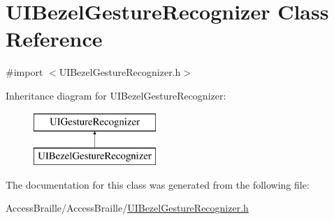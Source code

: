 \hypertarget{interface_u_i_bezel_gesture_recognizer}{\section{U\-I\-Bezel\-Gesture\-Recognizer Class Reference}
\label{interface_u_i_bezel_gesture_recognizer}
}


{\ttfamily \#import $<$U\-I\-Bezel\-Gesture\-Recognizer.\-h$>$}

Inheritance diagram for U\-I\-Bezel\-Gesture\-Recognizer\-:\begin{figure}[H]
\begin{center}
\leavevmode
\includegraphics[height=2.000000cm]{interface_u_i_bezel_gesture_recognizer}
\end{center}
\end{figure}


The documentation for this class was generated from the following file\-:\begin{DoxyCompactItemize}
\item 
Access\-Braille/\-Access\-Braille/\hyperlink{_u_i_bezel_gesture_recognizer_8h}{U\-I\-Bezel\-Gesture\-Recognizer.\-h}\end{DoxyCompactItemize}
